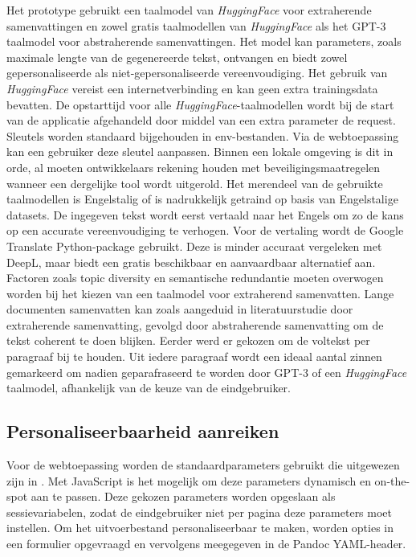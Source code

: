 Het prototype gebruikt een taalmodel van \textit{HuggingFace} voor extraherende samenvattingen en zowel gratis taalmodellen van \textit{HuggingFace} als het GPT-3 taalmodel voor abstraherende samenvattingen. Het model kan parameters, zoals maximale lengte van de gegenereerde tekst, ontvangen en biedt zowel gepersonaliseerde als niet-gepersonaliseerde vereenvoudiging. Het gebruik van \textit{HuggingFace} vereist een internetverbinding en kan geen extra trainingsdata bevatten. De opstarttijd voor alle \textit{HuggingFace}-taalmodellen wordt bij de start van de applicatie afgehandeld door middel van een extra parameter de request. Sleutels worden standaard bijgehouden in env-bestanden. Via de webtoepassing kan een gebruiker deze sleutel aanpassen. Binnen een lokale omgeving is dit in orde, al moeten ontwikkelaars rekening houden met beveiligingsmaatregelen wanneer een dergelijke tool wordt uitgerold. Het merendeel van de gebruikte taalmodellen is Engelstalig of is nadrukkelijk getraind op basis van Engelstalige datasets. De ingegeven tekst wordt eerst vertaald naar het Engels om zo de kans op een accurate vereenvoudiging te verhogen. Voor de vertaling wordt de Google Translate Python-package gebruikt. Deze is minder accuraat vergeleken met DeepL, maar biedt een gratis beschikbaar en aanvaardbaar alternatief aan. Factoren zoals topic diversity en semantische redundantie moeten overwogen worden bij het kiezen van een taalmodel voor extraherend samenvatten. Lange documenten samenvatten kan zoals aangeduid in literatuurstudie door extraherende samenvatting, gevolgd door abstraherende samenvatting om de tekst coherent te doen blijken. Eerder werd er gekozen om de voltekst per paragraaf bij te houden. Uit iedere paragraaf wordt een ideaal aantal zinnen gemarkeerd om nadien geparafraseerd te worden door GPT-3 of een \textit{HuggingFace} taalmodel, afhankelijk van de keuze van de eindgebruiker.


\subsection{Personaliseerbaarheid aanreiken}

Voor de webtoepassing worden de standaardparameters gebruikt die uitgewezen zijn in \textcite{Rello2013a, Rello2013b}. Met JavaScript is het mogelijk om deze parameters dynamisch en on-the-spot aan te passen. Deze gekozen parameters worden opgeslaan als sessievariabelen, zodat de eindgebruiker niet per pagina deze parameters moet instellen. Om het uitvoerbestand personaliseerbaar te maken, worden opties in een formulier opgevraagd en vervolgens meegegeven in de Pandoc YAML-header.


